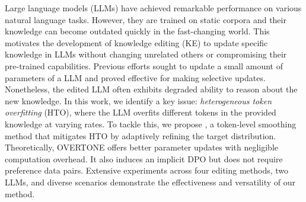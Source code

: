 Large language models (LLMs) have achieved remarkable performance on various natural language tasks. However, they are trained on static corpora and their knowledge can become outdated quickly in the fast-changing world. 
This motivates the development of knowledge editing (KE) to update specific knowledge in LLMs without changing unrelated others or compromising their pre-trained capabilities. 
Previous efforts sought to update a small amount of parameters of a LLM and proved effective for making selective updates.  
Nonetheless, the edited LLM often exhibits degraded ability to reason about the new knowledge. 
In this work, we identify a key issue: \textit{heterogeneous token overfitting} (HTO), where the LLM overfits different tokens in the provided knowledge at varying rates.
To tackle this, we propose {\NAME}, a token-level smoothing method that mitigates HTO by adaptively refining the target distribution. 
Theoretically, OVERTONE offers better parameter updates with negligible computation overhead. 
It also induces an implicit DPO but does not require preference data pairs. 
Extensive experiments across four editing methods, two LLMs, and diverse scenarios demonstrate the effectiveness and versatility of our method. 
